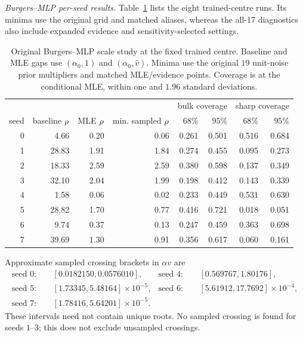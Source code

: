 \emph{Burgers--MLP per-seed results.}\label{app:n1}
Table~\ref{tab:n1-scales} lists the eight trained-centre runs. Its minima use the
original grid and matched aliases, whereas the all-17 diagnostics also include expanded
evidence and sensitivity-selected settings.

\begin{table}[ht]
\centering\small\setlength{\tabcolsep}{4pt}


\begin{tabular}{@{}rrrrrrrr@{}}
\toprule
 & & & & \multicolumn{2}{c}{bulk coverage} & \multicolumn{2}{c}{sharp coverage}\\
seed & baseline $\rho$ & MLE $\rho$ & min. sampled $\rho$
 & $68\%$ & $95\%$ & $68\%$ & $95\%$\\
\midrule
0 & 4.66 & 0.20 & 0.06 & 0.261 & 0.501 & 0.516 & 0.684 \\
1 & 28.83 & 1.91 & 1.84 & 0.274 & 0.455 & 0.095 & 0.273 \\
2 & 18.33 & 2.59 & 2.59 & 0.380 & 0.598 & 0.137 & 0.349 \\
3 & 32.10 & 2.04 & 1.99 & 0.198 & 0.412 & 0.143 & 0.339 \\
4 & 1.58 & 0.06 & 0.02 & 0.233 & 0.449 & 0.531 & 0.630 \\
5 & 28.82 & 1.70 & 0.77 & 0.416 & 0.721 & 0.018 & 0.051 \\
6 & 9.74 & 0.37 & 0.13 & 0.247 & 0.459 & 0.363 & 0.698 \\
7 & 39.69 & 1.30 & 0.91 & 0.356 & 0.617 & 0.060 & 0.161 \\
\bottomrule
\end{tabular}
\caption{Original Burgers--MLP scale study at the fixed trained centre. Baseline and MLE gaps
use $(\alpha_0,1)$ and $(\alpha_0,\widehat v)$. Minima use the original $19$ unit-noise prior multipliers and
matched MLE/evidence points. Coverage is at the conditional MLE, within one and $1.96$
standard deviations.}
\label{tab:n1-scales}
\end{table}

Approximate sampled crossing brackets in $\alpha v$ are
\[
\begin{aligned}
\text{seed }0:&\quad[0.0182150,0.0576010],&
\text{seed }4:&\quad[0.569767,1.80176],\\
\text{seed }5:&\quad[1.73345,5.48164]\times10^{-5},&
\text{seed }6:&\quad[5.61912,17.7692]\times10^{-4},\\
\text{seed }7:&\quad[1.78416,5.64201]\times10^{-5}.&&
\end{aligned}
\]
These intervals need not contain unique roots.
No sampled crossing is found for seeds $1$--$3$; this does not exclude unsampled crossings.

